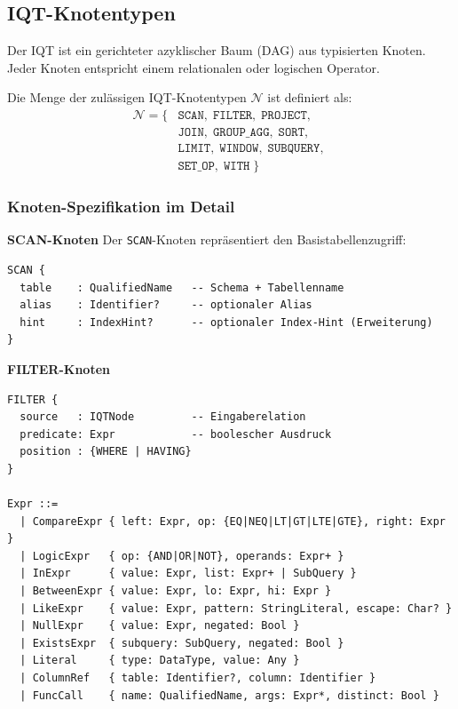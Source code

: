 \subsection{IQT-Knotentypen}
\label{subsec:iqt_knoten}

Der IQT ist ein gerichteter azyklischer Baum (DAG) aus typisierten Knoten.
Jeder Knoten entspricht einem relationalen oder logischen Operator.

\begin{definition}
\label{def:iqt_knoten}
Die Menge der zulässigen IQT-Knotentypen $\mathcal{N}$ ist definiert als:
\begin{align*}
\mathcal{N} = \{
  &\mathtt{SCAN},\; \mathtt{FILTER},\; \mathtt{PROJECT},\; \\
  &\mathtt{JOIN},\; \mathtt{GROUP\_AGG},\; \mathtt{SORT},\; \\
  &\mathtt{LIMIT},\; \mathtt{WINDOW},\; \mathtt{SUBQUERY},\; \\
  &\mathtt{SET\_OP},\; \mathtt{WITH}\;\}
\end{align*}
\end{definition}

\subsubsection{Knoten-Spezifikation im Detail}

\textbf{SCAN-Knoten}
Der \texttt{SCAN}-Knoten repräsentiert den Basistabellenzugriff:

\begin{lstlisting}[style=sqlstyle, caption={IQT-Pseudonotation: SCAN},
  label=lst:iqt_scan]
SCAN {
  table    : QualifiedName   -- Schema + Tabellenname
  alias    : Identifier?     -- optionaler Alias
  hint     : IndexHint?      -- optionaler Index-Hint (Erweiterung)
}
\end{lstlisting}

\textbf{FILTER-Knoten}
\begin{lstlisting}[style=sqlstyle, caption={IQT-Pseudonotation: FILTER},
  label=lst:iqt_filter]
FILTER {
  source   : IQTNode         -- Eingaberelation
  predicate: Expr            -- boolescher Ausdruck
  position : {WHERE | HAVING}
}

Expr ::=
  | CompareExpr { left: Expr, op: {EQ|NEQ|LT|GT|LTE|GTE}, right: Expr }
  | LogicExpr   { op: {AND|OR|NOT}, operands: Expr+ }
  | InExpr      { value: Expr, list: Expr+ | SubQuery }
  | BetweenExpr { value: Expr, lo: Expr, hi: Expr }
  | LikeExpr    { value: Expr, pattern: StringLiteral, escape: Char? }
  | NullExpr    { value: Expr, negated: Bool }
  | ExistsExpr  { subquery: SubQuery, negated: Bool }
  | Literal     { type: DataType, value: Any }
  | ColumnRef   { table: Identifier?, column: Identifier }
  | FuncCall    { name: QualifiedName, args: Expr*, distinct: Bool }
\end{lstlisting}

